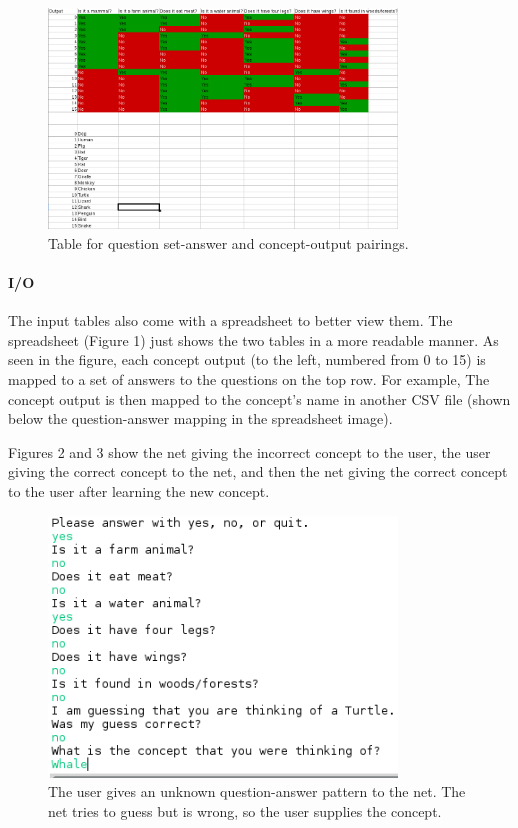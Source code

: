 \documentclass[12pt]{article}
\begin{document}
\begin{figure}
\centering
\includegraphics[width=350]{mappingtable.png}
\caption{Table for question set-answer and concept-output pairings.}
\end{figure}

\paragraph*{I/O}
The input tables also come with a spreadsheet to better view them. The spreadsheet (Figure 1) just shows the two tables in a more readable manner. As seen in the figure, each concept output (to the left, numbered from 0 to 15) is mapped to a set of answers to the questions on the top row. For example, The concept output is then mapped to the concept's name in another CSV file (shown below the question-answer mapping in the spreadsheet image).

Figures 2 and 3 show the net giving the incorrect concept to the user, the user giving the correct concept to the net, and then the net giving the correct concept to the user after learning the new concept.

\begin{figure}
\centering
\includegraphics[width=350]{incorrect_input.png}
\caption{The user gives an unknown question-answer pattern to the net. The net tries to guess but is wrong, so the user supplies the concept.}
\end{figure}
\end{document}
